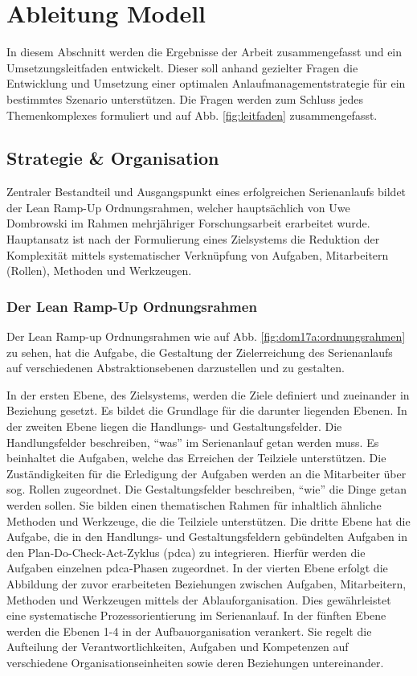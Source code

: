 \chapter{Ableitung Modell}\label{sec:ableitung}
In diesem Abschnitt werden die Ergebnisse der Arbeit zusammengefasst und ein Umsetzungsleitfaden entwickelt. %
Dieser soll anhand gezielter Fragen die Entwicklung und Umsetzung einer optimalen Anlaufmanagementstrategie für ein bestimmtes Szenario unterstützen. 
Die Fragen werden zum Schluss jedes Themenkomplexes formuliert und auf Abb. \ref{fig:leitfaden} %
zusammengefasst. 

\section{Strategie \& Organisation}

Zentraler Bestandteil und Ausgangspunkt eines erfolgreichen Serienanlaufs bildet der Lean Ramp-Up Ordnungsrahmen, welcher hauptsächlich von Uwe Dombrowski im Rahmen mehrjähriger Forschungsarbeit erarbeitet wurde. Hauptansatz ist nach der Formulierung eines Zielsystems die Reduktion der Komplexität mittels systematischer Verknüpfung von Aufgaben, Mitarbeitern (Rollen), Methoden und Werkzeugen. 

\subsection*{Der Lean Ramp-Up Ordnungsrahmen}
 Der Lean Ramp-up Ordnungsrahmen wie auf Abb. \ref{fig:dom17a:ordnungsrahmen} zu sehen, hat die Aufgabe, die Gestaltung der Zielerreichung des Serienanlaufs auf verschiedenen Abstraktionsebenen darzustellen und zu gestalten. 
 
In der ersten Ebene, des Zielsystems, werden die Ziele definiert und zueinander in Beziehung gesetzt. Es bildet die Grundlage für die darunter liegenden Ebenen. 
% 
In der zweiten Ebene liegen die Handlungs- und Gestaltungsfelder. Die Handlungsfelder beschreiben, ``was'' im Serienanlauf getan werden muss. 
Es beinhaltet die Aufgaben, welche das Erreichen der Teilziele unterstützen. Die Zuständigkeiten für die Erledigung der Aufgaben werden an die Mitarbeiter über sog. Rollen zugeordnet.
Die Gestaltungsfelder beschreiben, ``wie'' die Dinge getan werden sollen. Sie bilden einen thematischen Rahmen für inhaltlich ähnliche Methoden und Werkzeuge, die die Teilziele unterstützen.
% 
Die dritte Ebene hat die Aufgabe, die in den Handlungs- und Gestaltungsfeldern gebündelten Aufgaben in den Plan-Do-Check-Act-Zyklus (\gls{pdca}) zu integrieren. Hierfür werden die Aufgaben einzelnen \gls{pdca}-Phasen zugeordnet. 
% 
In der vierten Ebene erfolgt die Abbildung der zuvor erarbeiteten Beziehungen zwischen Aufgaben, Mitarbeitern, Methoden und Werkzeugen mittels der Ablauforganisation.  Dies gewährleistet eine systematische Prozessorientierung im Serienanlauf. 
% 
In der fünften Ebene werden die Ebenen 1-4 in der Aufbauorganisation verankert. Sie regelt die Aufteilung der Verantwortlichkeiten, Aufgaben und Kompetenzen auf verschiedene Organisationseinheiten sowie deren Beziehungen untereinander. 

